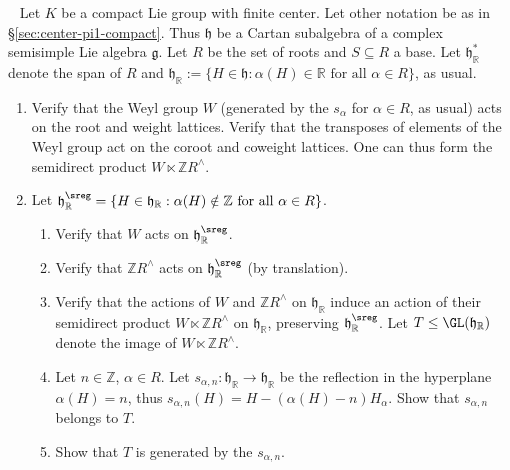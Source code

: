 \documentclass[reqno]{amsart} 
\begin{document}
\begin{homework}
~
  Let
    $K$ be a compact Lie group
    with finite center.
    Let other notation be as in
    \S\ref{sec:center-pi1-compact}.
    Thus
    $\mathfrak{h}$ be a Cartan subalgebra of a complex
    semisimple Lie algebra $\mathfrak{g}$.  Let $R$ be the set
    of roots and $S \subseteq R$ a base.
    Let $\mathfrak{h}_\mathbb{R}^*$ denote the span of $R$
    and $\mathfrak{h}_\mathbb{R} := \{H \in \mathfrak{h} :
    \alpha(H) \in \mathbb{R}
    \text{ for all } \alpha \in R\}$,
    as usual.
  \begin{enumerate}
  \item Verify that the Weyl group
    $W$ (generated by the $s_\alpha$ for $\alpha \in R$,
    as usual)
    acts on
    the root and weight lattices.
    Verify that the transposes of elements of the Weyl group
    act on the coroot and coweight lattices.
    One can thus form the semidirect product
    $W \ltimes \mathbb{Z} R^\wedge$.
  \item Let
    $\mathfrak{h}_\mathbb{R}^{\sreg} = \{H \in
    \mathfrak{h}_\mathbb{R} : \alpha(H) \notin \mathbb{Z} \text{
      for all } \alpha\in R \}$.
    \begin{enumerate}
    \item Verify that $W$ acts on
      $\mathfrak{h}_{\mathbb{R}}^{\sreg}$.
    \item Verify that $\mathbb{Z} R^\wedge$ acts on
      $\mathfrak{h}_\mathbb{R}^{\sreg}$ (by translation).
    \item Verify that the actions of $W$ and $\mathbb{Z} R^\wedge$
      on $\mathfrak{h}_\mathbb{R}$
      induce an action of their semidirect product $W \ltimes
      \mathbb{Z} R^\wedge$ on $\mathfrak{h}_{\mathbb{R}}$,
      preserving  $\mathfrak{h}_{\mathbb{R}}^{\sreg}$.
      Let $T \leq \GL(\mathfrak{h}_{\mathbb{R}})$ denote the image of $W \ltimes \mathbb{Z}
      R^\wedge$.
    \item Let $n \in \mathbb{Z}$, $\alpha \in R$.
      Let $s_{\alpha,n} : \mathfrak{h}_{\mathbb{R}} \rightarrow
      \mathfrak{h}_{\mathbb{R}}$
      be the reflection in the hyperplane $\alpha(H) = n$,
      thus $s_{\alpha,n}(H) = H - (\alpha(H) - n) H_\alpha$.
      Show that
      $s_{\alpha,n}$ belongs to $T$.
    \item Show that $T$ is generated
      by the $s_{\alpha,n}$.
    \end{enumerate}


\end{enumerate}
\end{homework}
\end{document}
